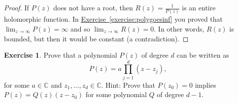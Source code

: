 \documentclass[12pt,openany]{book}
\newcommand{\sabs}[1]{\lvert {#1} \rvert}
\newcommand{\abs}[1]{\left\lvert {#1} \right\rvert}
\newcommand{\C}{{\mathbb{C}}}
\theoremstyle{plain}
\theoremstyle{remark}
\theoremstyle{definition}
\newenvironment{exbox}{%
    \def\FrameCommand{\vrule width 1pt \relax\hspace {10pt}}%
    \MakeFramed {\advance \hsize -\width \FrameRestore }%
}{%
    \endMakeFramed
}
\theoremstyle{exercise}
\newtheorem{exercise}{Exercise}[section]
\theoremstyle{example}
\newcommand{\exerciseref}[1]{\hyperref[#1]{Exercise~\ref*{#1}}}
\begin{document}
\begin{proof}
If $P(z)$ does not have a root, then $R(z) = \frac{1}{P(z)}$ is
an entire holomorphic function.
In \exerciseref{exercise:polygoesinf} you proved that
$\lim_{z \to \infty} P(z) = \infty$ and so
$\lim_{z \to \infty} R(z) = 0$.  In other words, $R(z)$ is bounded, but then
it would be constant (a contradiction).
%
%
\end{proof}

\begin{exbox}
\begin{exercise}
Prove that a polynomial $P(z)$ of degree $d$ can be written as
\begin{equation*}
P(z) = a \prod_{j=1}^d (z-z_j) ,
\end{equation*}
for some $a \in \C$ and $z_1,\ldots,z_d \in \C$.
Hint: Prove that $P(z_0) = 0$ implies $P(z) = Q(z) (z-z_0)$ for some
polynomial $Q$ of degree $d-1$.
\end{exercise}
\end{exbox}
\end{document}
